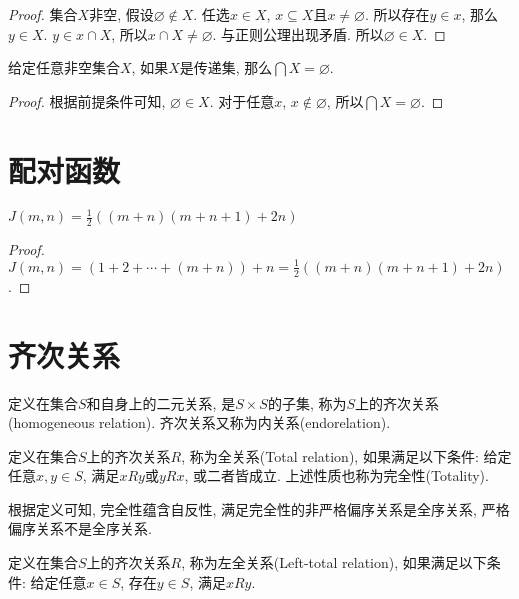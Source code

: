 \begin{proof}
	集合$X$非空, 假设$\varnothing \notin X$. 任选$x\in X$, $x\subseteq X$且$x\neq \varnothing$. 所以存在$y\in x$, 那么$y\in X$. $y\in x\cap X$, 所以$x\cap X\neq \varnothing$. 与正则公理出现矛盾. 所以$\varnothing \in X$.
\end{proof}

\begin{proposition}
	给定任意非空集合$X$, 如果$X$是传递集, 那么$\bigcap X=\varnothing$.
\end{proposition}

\begin{proof}
	根据前提条件可知, $\varnothing \in X$. 对于任意$x$, $x\notin \varnothing$, 所以$\bigcap X=\varnothing$.
\end{proof}

\section{配对函数}
\begin{proposition}
	$J(m,n)=\frac{1}{2}((m+n)(m+n+1)+2n)$
\end{proposition}

\begin{proof}
	$J(m,n)=(1+2+\cdots+(m+n))+n=\frac{1}{2}((m+n)(m+n+1)+2n)$.
\end{proof}

\section{齐次关系}
\begin{definition}[齐次关系]
	定义在集合$S$和自身上的二元关系, 是$S\times S$的子集, 称为$S$上的齐次关系(homogeneous relation). 齐次关系又称为内关系(endorelation).
\end{definition}

\begin{definition}[全关系]
	定义在集合$S$上的齐次关系$R$, 称为全关系(Total relation), 如果满足以下条件: 给定任意$x,y\in S$, 满足$xRy$或$yRx$, 或二者皆成立. 上述性质也称为完全性(Totality).
\end{definition}

根据定义可知, 完全性蕴含自反性, 满足完全性的非严格偏序关系是全序关系, 严格偏序关系不是全序关系.

\begin{definition}[左全关系]
	定义在集合$S$上的齐次关系$R$, 称为左全关系(Left-total relation), 如果满足以下条件: 给定任意$x\in S$, 存在$y\in S$, 满足$xRy$.
\end{definition}

